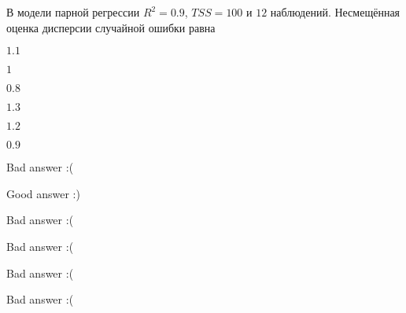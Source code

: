
\begin{question}
В модели парной регрессии \(R^2 = 0.9\), \(TSS = 100\) и \(12\) наблюдений.
Несмещённая оценка дисперсии случайной ошибки равна
\begin{answerlist}
  \item \(1.1\)
  \item \(1\)
  \item \(0.8\)
  \item \(1.3\)
  \item \(1.2\)
  \item \(0.9\)
\end{answerlist}
\end{question}

\begin{solution}
\begin{answerlist}
  \item Bad answer :(
  \item Good answer :)
  \item Bad answer :(
  \item Bad answer :(
  \item Bad answer :(
  \item Bad answer :(
\end{answerlist}
\end{solution}

